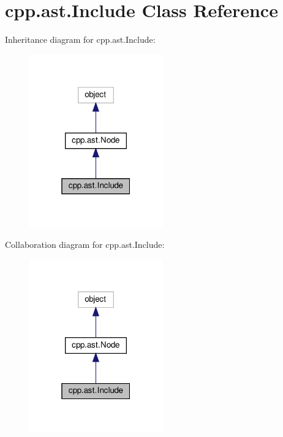 \hypertarget{classcpp_1_1ast_1_1_include}{}\section{cpp.\+ast.\+Include Class Reference}
\label{classcpp_1_1ast_1_1_include}


Inheritance diagram for cpp.\+ast.\+Include\+:
\nopagebreak
\begin{figure}[H]
\begin{center}
\leavevmode
\includegraphics[width=163pt]{classcpp_1_1ast_1_1_include__inherit__graph}
\end{center}
\end{figure}


Collaboration diagram for cpp.\+ast.\+Include\+:
\nopagebreak
\begin{figure}[H]
\begin{center}
\leavevmode
\includegraphics[width=163pt]{classcpp_1_1ast_1_1_include__coll__graph}
\end{center}
\end{figure}

